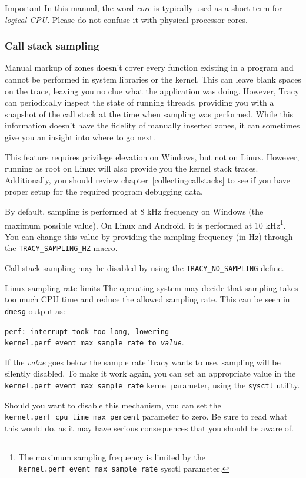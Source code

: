 \documentclass[hidelinks,titlepage,a4paper]{article}
\begin{document}
\begin{bclogo}[
noborder=true,
couleur=black!5,
logo=\bcbombe
]{Important}
In this manual, the word \emph{core} is typically used as a short term for \emph{logical CPU}. Please do not confuse it with physical processor cores.
\end{bclogo}

\subsubsection{Call stack sampling}
\label{sampling}

Manual markup of zones doesn't cover every function existing in a program and cannot be performed in system libraries or the kernel. This can leave blank spaces on the trace, leaving you no clue what the application was doing. However, Tracy can periodically inspect the state of running threads, providing you with a snapshot of the call stack at the time when sampling was performed. While this information doesn't have the fidelity of manually inserted zones, it can sometimes give you an insight into where to go next.

This feature requires privilege elevation on Windows, but not on Linux. However, running as root on Linux will also provide you the kernel stack traces. Additionally, you should review chapter~\ref{collectingcallstacks} to see if you have proper setup for the required program debugging data.

By default, sampling is performed at 8 kHz frequency on Windows (the maximum possible value). On Linux and Android, it is performed at 10 kHz\footnote{The maximum sampling frequency is limited by the \texttt{kernel.perf\_event\_max\_sample\_rate} sysctl parameter.}. You can change this value by providing the sampling frequency (in Hz) through the \texttt{TRACY\_SAMPLING\_HZ} macro.

Call stack sampling may be disabled by using the \texttt{TRACY\_NO\_SAMPLING} define.

\begin{bclogo}[
noborder=true,
couleur=black!5,
logo=\bcbombe
]{Linux sampling rate limits}
The operating system may decide that sampling takes too much CPU time and reduce the allowed sampling rate. This can be seen in \texttt{dmesg} output as:

\texttt{perf: interrupt took too long, lowering kernel.perf\_event\_max\_sample\_rate to \emph{value}}.

If the \emph{value} goes below the sample rate Tracy wants to use, sampling will be silently disabled. To make it work again, you can set an appropriate value in the \texttt{kernel.perf\_event\_max\_sample\_rate} kernel parameter, using the \texttt{sysctl} utility.

Should you want to disable this mechanism, you can set the \texttt{kernel.perf\_cpu\_time\_max\_percent} parameter to zero. Be sure to read what this would do, as it may have serious consequences that you should be aware of.
\end{bclogo}
\end{document}
